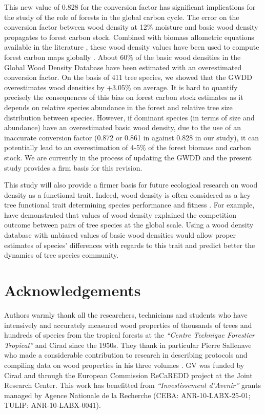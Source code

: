 \documentclass[a4paper, 12pt, leqno, dvipsnames]{article}\usepackage[]{graphicx}\usepackage[]{color}
\begin{document}
This new value of 0.828 for the conversion factor has significant implications for the study of the role of forests in the global carbon cycle. The error on the conversion factor between wood density at 12\% moisture and basic wood density propagates to forest carbon stock. Combined with biomass allometric equations available in the literature \citep{Chave2005, Chave2014, Vieilledent2012}, these wood density values have been used to compute forest carbon maps globally \citep{Saatchi2011, Baccini2012, Avitabile2016, Baccini2017}. About 60\% of the basic wood densities in the Global Wood Density Database have been estimated with an overestimated conversion factor. On the basis of 411 tree species, we showed that the GWDD overestimates wood densities by +3.05\% on average. It is hard to quantify precisely the consequences of this bias on forest carbon stock estimates as it depends on relative species abundance in the forest and relative tree size distribution between species. However, if dominant species (in terms of size and abundance) have an overestimated basic wood density, due to the use of an inaccurate conversion factor (0.872 or 0.861 in \citep{Chave2006, Chave2009} against 0.828 in our study), it can potentially lead to an overestimation of 4-5\% of the forest biomass and carbon stock. We are currently in the process of updating the GWDD and the present study provides a firm basis for this revision.

This study will also provide a firmer basis for future ecological research on wood density as a functional trait. Indeed, wood density is often considered as a key tree functional trait determining species performance and fitness \citep{Chave2009, Baraloto2010, Kunstler2016, Diaz2016, Greenwood2017}. For example, \citet{Kunstler2016} have demonstrated that values of wood density explained the competition outcome between pairs of tree species at the global scale. Using a wood density database with unbiased values of basic wood densities would allow proper estimates of species' differences with regards to this trait and predict better the dynamics of tree species community.

\newpage

\section{Acknowledgements}

Authors warmly thank all the researchers, technicians and students who have intensively and accurately measured wood properties of thousands of trees and hundreds of species from the tropical forests at the \emph{``Centre Technique Forestier Tropical''} and Cirad since the 1950s. They thank in particular Pierre Sallenave who made a considerable contribution to research in describing protocols and compiling data on wood properties in his three volumes \citep{Sallenave1955, Sallenave1964, Sallenave1971}. GV was funded by Cirad and through the European Commission ReCaREDD project at the Joint Research Center. This work has benefitted from \emph{``Investissement d'Avenir''} grants managed by Agence Nationale de la Recherche (CEBA: ANR-10-LABX-25-01; TULIP: ANR-10-LABX-0041).
\end{document}
